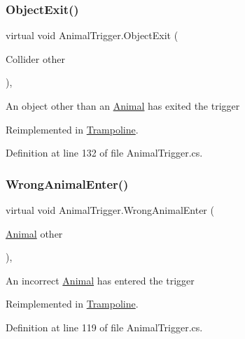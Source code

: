 \subsubsection{\texorpdfstring{Object\+Exit()}{ObjectExit()}}
{\footnotesize\ttfamily virtual void Animal\+Trigger.\+Object\+Exit (\begin{DoxyParamCaption}\item[{Collider}]{other }\end{DoxyParamCaption})\hspace{0.3cm}{\ttfamily [protected]}, {\ttfamily [virtual]}}



An object other than an \mbox{\hyperlink{class_animal}{Animal}} has exited the trigger 



Reimplemented in \mbox{\hyperlink{class_trampoline_a3924d1f315181a81e2117ab239b8ec0e}{Trampoline}}.



Definition at line 132 of file Animal\+Trigger.\+cs.

\mbox{\label{class_animal_trigger_a7a27e866d74251de063bb4a36c99e99d}} 
\subsubsection{\texorpdfstring{Wrong\+Animal\+Enter()}{WrongAnimalEnter()}}
{\footnotesize\ttfamily virtual void Animal\+Trigger.\+Wrong\+Animal\+Enter (\begin{DoxyParamCaption}\item[{\mbox{\hyperlink{class_animal}{Animal}}}]{other }\end{DoxyParamCaption})\hspace{0.3cm}{\ttfamily [protected]}, {\ttfamily [virtual]}}



An incorrect \mbox{\hyperlink{class_animal}{Animal}} has entered the trigger 



Reimplemented in \mbox{\hyperlink{class_trampoline_a7ffb817b148f86e9cc5dd7faa1af7c0c}{Trampoline}}.



Definition at line 119 of file Animal\+Trigger.\+cs.

\mbox{\label{class_animal_trigger_abbdf7b21fc9595ff639b96e6baecec46}} 

